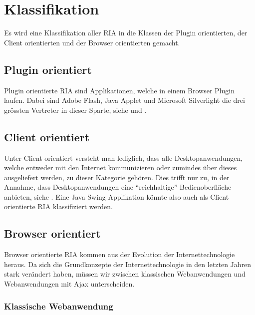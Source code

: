   \section{Klassifikation}
  
  Es wird eine Klassifikation aller \ac{RIA} in die Klassen der Plugin
  orientierten, der Client orientierten und der Browser orientierten gemacht.
  
  \subsection{Plugin orientiert}
  
  Plugin orientierte \ac{RIA} sind Applikationen, welche in einem Browser
  Plugin laufen. Dabei sind Adobe Flash, Java Applet und Microsoft Silverlight
  die drei grössten Vertreter in dieser Sparte, siehe \cite{RichInternetApplications}
  und \cite{RichInternetApplicationMarketShare}.

  \subsection{Client orientiert}
  
  Unter Client orientiert versteht man lediglich, dass alle Desktopanwendungen,
  welche entweder mit den Internet kommunizieren oder zumindes über dieses
  ausgeliefert werden, zu dieser Kategorie gehören. Dies trifft nur zu, in der
  Annahme, dass Desktopanwendungen eine ``reichhaltige'' Bedienoberfläche
  anbieten, siehe \cite{RichInternetApplication}. Eine Java Swing Applikation
  könnte also auch als Client orientierte \ac{RIA} klassifiziert werden.
  
  \subsection{Browser orientiert}
  
  Browser orientierte \ac{RIA} kommen aus der Evolution der Internettechnologie
  heraus. Da sich die Grundkonzepte der Internettechnologie in den letzten
  Jahren stark verändert haben, müssen wir zwischen klassischen Webanwendungen
  und Webanwendungen mit Ajax unterscheiden.
  
  \subsubsection{Klassische Webanwendung}
  
